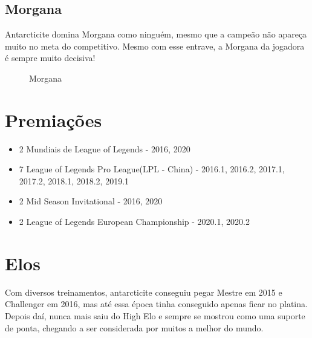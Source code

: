 \begin{multicols}{2}
	\subsection*{Morgana}
	Antarcticite domina Morgana como ninguém, mesmo que a campeão não apareça muito no meta do competitivo. Mesmo com esse entrave, a Morgana da jogadora é sempre muito decisiva!
	\begin{figure}[H]
		\centering
		\caption{Morgana}
		\label{fig:fig10}
	\end{figure}
	
	\section*{Premiações}
	\begin{itemize}
		\item 2 Mundiais de League of Legends - 2016, 2020
		\item 7 League of Legends Pro League(LPL - China) - 2016.1, 2016.2, 2017.1, 2017.2, 2018.1, 2018.2, 2019.1
		\item 2 Mid Season Invitational - 2016, 2020
		\item 2 League of Legends European Championship - 2020.1, 2020.2
	\end{itemize}
	
	\section*{Elos}
	Com diversos treinamentos, antarcticite conseguiu pegar Mestre em 2015 e Challenger em 2016, mas até essa época tinha conseguido apenas ficar no platina. Depois daí, nunca mais saiu do High Elo e sempre se mostrou como uma suporte de ponta, chegando a ser considerada por muitos a melhor do mundo.
\end{multicols}
